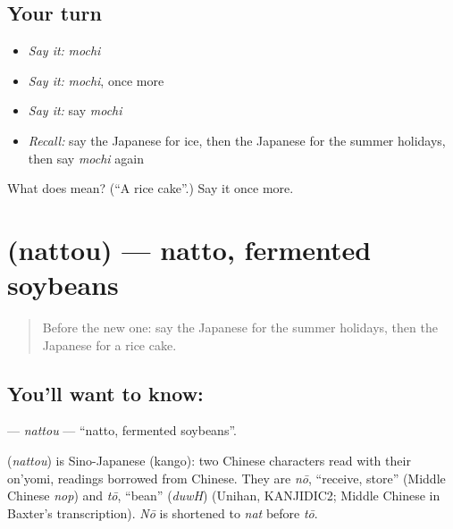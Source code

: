 \subsection*{Your turn}
\begin{itemize}
\raggedright
  \item \emph{Say it:} \emph{mochi}
  \item \emph{Say it:} \emph{mochi}, once more
  \item \emph{Say it:} say \emph{mochi}
  \item \emph{Recall:} say the Japanese for ice, then the Japanese for the summer holidays, then say \emph{mochi} again
\end{itemize}

\begin{tcolorbox}[breakable,colback=teal!4,colframe=teal!35!black,title={Before you move on}]
What does  mean? (\textquotedblleft{}A rice cake\textquotedblright{}.) Say it once more.
\end{tcolorbox}
\section[\texorpdfstring{\ja{なっとう} (nattou)}{なっとう (nattou)}]{ (nattou) — natto, fermented soybeans}

\label{lesson:JA-C70-nattou}



\begin{quote}
Before the new one: say the Japanese for the summer holidays, then the Japanese for a rice cake.
\end{quote}

\subsection*{You'll want to know: }
\textbf{} — \emph{nattou} — \textquotedblleft{}natto, fermented soybeans\textquotedblright{}.

\begin{cousinweb}
\textbf{} (\emph{nattou}) is Sino-Japanese (kango): two Chinese characters read with their on'yomi, readings borrowed from Chinese. They are \emph{nō}, \textquotedblleft{}receive, store\textquotedblright{} (Middle Chinese \emph{nop}) and \emph{tō}, \textquotedblleft{}bean\textquotedblright{} (\emph{duwH}) (Unihan, KANJIDIC2; Middle Chinese in Baxter's transcription). \emph{Nō} is shortened to \emph{nat} before \emph{tō}.
\end{cousinweb}

